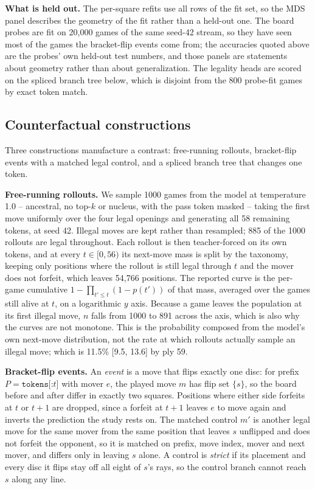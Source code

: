 \documentclass{article}
\begin{document}
\textbf{What is held out.} The per-square refits use all rows of the fit set, so the MDS panel
describes the geometry of the fit rather than a held-out one. The board probes are fit on 20,000
games of the same seed-42 stream, so they have seen most of the games the bracket-flip events
come from; the accuracies quoted above are the probes' own held-out test numbers, and those
panels are statements about geometry rather than about generalization. The legality heads are
scored on the spliced branch tree below, which is disjoint from the 800 probe-fit games by exact
token match.

\subsection{Counterfactual constructions}

Three constructions manufacture a contrast: free-running rollouts, bracket-flip events with a
matched legal control, and a spliced branch tree that changes one token.

\textbf{Free-running rollouts.} We sample 1000 games from the model at temperature 1.0 --
ancestral, no top-$k$ or nucleus, with the pass token masked -- taking the first move uniformly
over the four legal openings and generating all 58 remaining tokens, at seed 42. Illegal moves
are kept rather than resampled; 885 of the 1000 rollouts are legal throughout. Each rollout is
then teacher-forced on its own tokens, and at every $t \in [0, 56)$ its next-move mass is split
by the taxonomy, keeping only positions where the rollout is still legal through $t$ and the
mover does not forfeit, which leaves 54,766 positions. The reported curve is the per-game
cumulative $1 - \prod_{t' \le t}(1 - p(t'))$ of that mass, averaged over the games still alive at
$t$, on a logarithmic $y$ axis. Because a game leaves the population at its first illegal move,
$n$ falls from 1000 to 891 across the axis, which is also why the curves are not monotone. This
is the probability composed from the model's own next-move distribution, not the rate at which
rollouts actually sample an illegal move; which is 11.5\% [9.5, 13.6] by ply 59.

\textbf{Bracket-flip events.} An \emph{event} is a move that flips exactly one disc: for prefix
$P = \texttt{tokens[:}t \texttt{]}$ with mover $e$, the played move $m$ has flip set $\{s\}$, so
the board before and after differ in exactly two squares. Positions where either side forfeits at
$t$ or $t+1$ are dropped, since a forfeit at $t+1$ leaves $e$ to move again and inverts the
prediction the study rests on. The matched control $m'$ is another legal move for the same mover
from the same position that leaves $s$ unflipped and does not forfeit the opponent, so it is
matched on prefix, move index, mover and next mover, and differs only in leaving $s$ alone. A
control is \emph{strict} if its placement and every disc it flips stay off all eight of $s$'s
rays, so the control branch cannot reach $s$ along any line.
\end{document}
